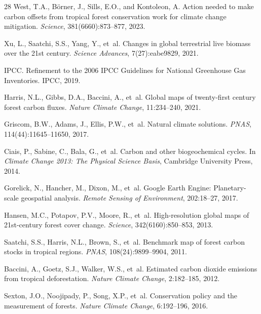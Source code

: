 \documentclass[11pt,a4paper]{article}
\begin{document}
\begin{thebibliography}{28}
West, T.A., B{\"o}rner, J., Sills, E.O., and Kontoleon, A.
\newblock Action needed to make carbon offsets from tropical forest
  conservation work for climate change mitigation.
\newblock \emph{Science}, 381(6660):873--877, 2023.

Xu, L., Saatchi, S.S., Yang, Y., et~al.
\newblock Changes in global terrestrial live biomass over the 21st century.
\newblock \emph{Science Advances}, 7(27):eabe9829, 2021.

IPCC.
 Refinement to the 2006 IPCC Guidelines for National Greenhouse
  Gas Inventories.
\newblock IPCC, 2019.

Harris, N.L., Gibbs, D.A., Baccini, A., et~al.
\newblock Global maps of twenty-first century forest carbon fluxes.
\newblock \emph{Nature Climate Change}, 11:234--240, 2021.

Griscom, B.W., Adams, J., Ellis, P.W., et~al.
\newblock Natural climate solutions.
\newblock \emph{PNAS}, 114(44):11645--11650, 2017.

Ciais, P., Sabine, C., Bala, G., et~al.
\newblock Carbon and other biogeochemical cycles.
\newblock In \emph{Climate Change 2013: The Physical Science Basis},
  Cambridge University Press, 2014.

Gorelick, N., Hancher, M., Dixon, M., et~al.
\newblock Google Earth Engine: Planetary-scale geospatial analysis.
\newblock \emph{Remote Sensing of Environment}, 202:18--27, 2017.

Hansen, M.C., Potapov, P.V., Moore, R., et~al.
\newblock High-resolution global maps of 21st-century forest cover change.
\newblock \emph{Science}, 342(6160):850--853, 2013.

Saatchi, S.S., Harris, N.L., Brown, S., et~al.
\newblock Benchmark map of forest carbon stocks in tropical regions.
\newblock \emph{PNAS}, 108(24):9899--9904, 2011.

Baccini, A., Goetz, S.J., Walker, W.S., et~al.
\newblock Estimated carbon dioxide emissions from tropical deforestation.
\newblock \emph{Nature Climate Change}, 2:182--185, 2012.

Sexton, J.O., Noojipady, P., Song, X.P., et~al.
\newblock Conservation policy and the measurement of forests.
\newblock \emph{Nature Climate Change}, 6:192--196, 2016.

\end{thebibliography}
\end{document}
